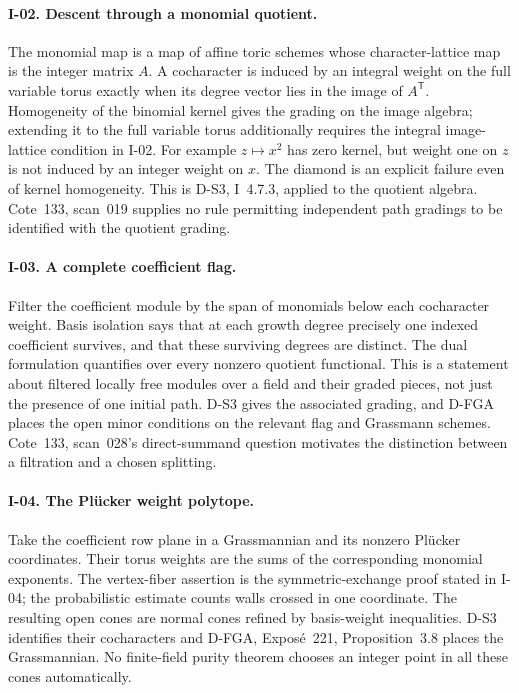 \paragraph{I-02. Descent through a monomial quotient.}
The monomial map is a map of affine toric schemes whose character-lattice map is the integer matrix $A$. A cocharacter is induced by an integral weight on the full variable torus exactly when its degree vector lies in the image of $A^{\mathsf T}$. Homogeneity of the binomial kernel gives the grading on the image algebra; extending it to the full variable torus additionally requires the integral image-lattice condition in I-02. For example $z\mapsto x^2$ has zero kernel, but weight one on $z$ is not induced by an integer weight on $x$. The diamond is an explicit failure even of kernel homogeneity. This is D-S3, I~4.7.3, applied to the quotient algebra. Cote~133, scan~019 supplies no rule permitting independent path gradings to be identified with the quotient grading.

\paragraph{I-03. A complete coefficient flag.}
Filter the coefficient module by the span of monomials below each cocharacter weight. Basis isolation says that at each growth degree precisely one indexed coefficient survives, and that these surviving degrees are distinct. The dual formulation quantifies over every nonzero quotient functional. This is a statement about filtered locally free modules over a field and their graded pieces, not just the presence of one initial path. D-S3 gives the associated grading, and D-FGA places the open minor conditions on the relevant flag and Grassmann schemes. Cote~133, scan~028's direct-summand question motivates the distinction between a filtration and a chosen splitting.

\paragraph{I-04. The Pl\"ucker weight polytope.}
Take the coefficient row plane in a Grassmannian and its nonzero Pl\"ucker coordinates. Their torus weights are the sums of the corresponding monomial exponents. The vertex-fiber assertion is the symmetric-exchange proof stated in I-04; the probabilistic estimate counts walls crossed in one coordinate. The resulting open cones are normal cones refined by basis-weight inequalities. D-S3 identifies their cocharacters and D-FGA, Expos\'e~221, Proposition~3.8 places the Grassmannian. No finite-field purity theorem chooses an integer point in all these cones automatically.

